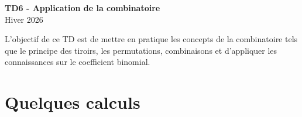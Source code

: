 \documentclass[a4paper,11pt]{article}
\begin{document}
\begin{center}
{\Huge\bfseries TD6 - Application de la combinatoire} \\[0.5cm]
{\large Hiver 2026} \\[0.3cm]
\end{center}

\vspace{0.5cm}

L'objectif de ce TD est de mettre en pratique les concepts de la combinatoire tels que le principe des tiroirs, les permutations, combinaisons et d'appliquer les connaissances sur le coefficient binomial.

\section{Quelques calculs}
\end{document}
